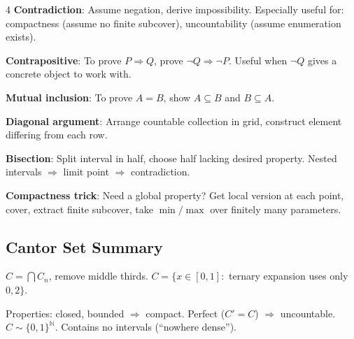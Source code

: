 \documentclass[9pt,landscape]{extarticle}
\newcommand{\N}{\mathbb{N}}
\theoremstyle{compact}
\begin{document}
\begin{multicols}{4}
\textbf{Contradiction}: Assume negation, derive impossibility. Especially useful for: compactness (assume no finite subcover), uncountability (assume enumeration exists).

\textbf{Contrapositive}: To prove $P \Rightarrow Q$, prove $\neg Q \Rightarrow \neg P$. Useful when $\neg Q$ gives a concrete object to work with.

\textbf{Mutual inclusion}: To prove $A = B$, show $A \subseteq B$ and $B \subseteq A$.

\textbf{Diagonal argument}: Arrange countable collection in grid, construct element differing from each row.

\textbf{Bisection}: Split interval in half, choose half lacking desired property. Nested intervals $\Rightarrow$ limit point $\Rightarrow$ contradiction.

\textbf{Compactness trick}: Need a global property? Get local version at each point, cover, extract finite subcover, take $\min/\max$ over finitely many parameters.

\subsection{Cantor Set Summary}
$C = \bigcap C_n$, remove middle thirds. $C = \{x \in [0,1] :$ ternary expansion uses only $0,2\}$.

Properties: closed, bounded $\Rightarrow$ compact. Perfect ($C' = C$) $\Rightarrow$ uncountable. $C \sim \{0,1\}^\N$. Contains no intervals (``nowhere dense'').

\end{multicols}
\end{document}

